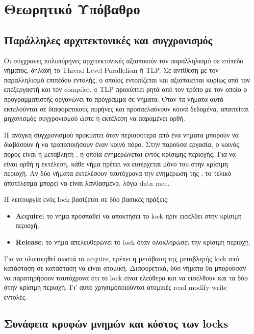 \documentclass{article}
\newcommand{\code}[1]{\texttt{\detokenize{#1}}}
\providecommand{\textenglish}[1]{\foreignlanguage{english}{#1}}
\begin{document}
\section{Θεωρητικό Υπόβαθρο}

\subsection{Παράλληλες αρχιτεκτονικές και συγχρονισμός}

Οι σύγχρονες πολυπύρηνες αρχιτεκτονικές αξιοποιούν τον παραλληλισμό σε επίπεδο νήματος, δηλαδή το \textenglish{Thread-Level Parallelism} ή TLP. Σε αντίθεση με τον παραλληλισμό επιπέδου εντολής, ο οποίος εντοπίζεται και αξιοποιείται κυρίως από τον επεξεργαστή και τον compiler, ο TLP προκύπτει ρητά από τον τρόπο με τον οποίο ο προγραμματιστής οργανώνει το πρόγραμμα σε νήματα. Όταν τα νήματα αυτά εκτελούνται σε διαφορετικούς πυρήνες και προσπελαύνουν κοινά δεδομένα, απαιτείται μηχανισμός συγχρονισμού ώστε η εκτέλεση να παραμένει ορθή.

Η ανάγκη συγχρονισμού προκύπτει όταν περισσότερα από ένα νήματα μπορούν να διαβάσουν ή να τροποποιήσουν έναν κοινό πόρο. Στην παρούσα εργασία, ο κοινός πόρος είναι η μεταβλητή \code{val}, η οποία ενημερώνεται εντός κρίσιμης περιοχής. Για να είναι ορθή η εκτέλεση, κάθε νήμα πρέπει να εισέρχεται μόνο του στην κρίσιμη περιοχή. Αν δύο νήματα εκτελέσουν ταυτόχρονα την ενημέρωση της \code{val}, το τελικό αποτέλεσμα μπορεί να είναι λανθασμένο, λόγω data race.

Η λειτουργία ενός lock βασίζεται σε δύο βασικές πράξεις:

\begin{itemize}
\item \textbf{Acquire}: το νήμα προσπαθεί να αποκτήσει το lock πριν εισέλθει στην κρίσιμη περιοχή.
\item \textbf{Release}: το νήμα απελευθερώνει το lock όταν ολοκληρώσει την κρίσιμη περιοχή.
\end{itemize}

Για να υλοποιηθεί σωστά το acquire, πρέπει η μετάβαση της μεταβλητής lock από κατάσταση \code{UNLOCKED} σε κατάσταση \code{LOCKED} να είναι ατομική. Διαφορετικά, δύο νήματα θα μπορούσαν να παρατηρήσουν ταυτόχρονα ότι το lock είναι ελεύθερο και να εισέλθουν και τα δύο στην κρίσιμη περιοχή. Γι' αυτό χρησιμοποιούνται ατομικές read-modify-write εντολές.

\subsection{Συνάφεια κρυφών μνημών και κόστος των locks}
\end{document}
